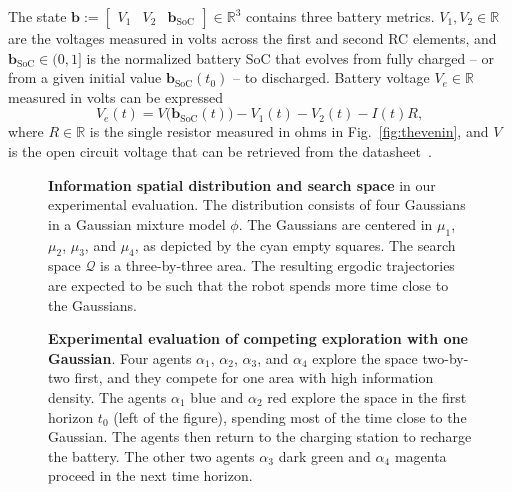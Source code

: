 \documentclass[letterpaper,10pt,conference,twoside]{IEEEtran}
\theoremstyle{definition}
\begin{document}
The state $\mathbf{b}:=\begin{bmatrix}V_1&V_2&\mathbf{b}_{\text{SoC}}\end{bmatrix}\in\mathbb{R}^3$ contains three battery metrics. $V_1,V_2\in\mathbb{R}$ are the voltages measured in volts across the first and second RC elements, and $\mathbf{b}_{\text{SoC}}\in(0,1]$ is the normalized battery SoC that evolves from fully charged -- or from a given initial value $\mathbf{b}_{\text{SoC}}(t_0)$ -- to discharged. 
%
Battery voltage $V_e\in\mathbb{R}$ measured in volts can be %
expressed %
\begin{equation}\label{eq:battvolt}
  V_e(t)=V\big(\mathbf{b}_{\text{SoC}}(t)\big)-V_1(t)-V_2(t)-I(t)R,
\end{equation}
where $R\in\mathbb{R}$ is the single resistor measured in ohms in Fig.~\ref{fig:thevenin}, and $V$ is the open circuit voltage that %
can be retrieved from the %
datasheet~\cite{hinz2019comparison}.


\begin{figure}[t!]
  \begin{minipage}[t!]{.5\columnwidth}
    \vspace*{-.2cm}
    
  \end{minipage}
  \begin{minipage}[c]{.48\columnwidth}
    \vspace*{.05cm}
    \caption{\textbf{Information spatial distribution and search space} in our experimental evaluation. The distribution consists of four Gaussians in a Gaussian mixture model $\phi$. The Gaussians are centered in $\mu_1$, $\mu_2$, $\mu_3$, and $\mu_4$, as depicted by the cyan empty squares. The search space $\mathcal{Q}$ is a three-by-three area. The resulting ergodic trajectories are expected to be such that the robot spends more time close to the Gaussians.}
    \label{fig:scenario}
  \end{minipage}
  \vspace*{-.15cm}
\end{figure}

\begin{figure}[b!]
  \vspace*{-.15cm}
  
  \caption{\textbf{Experimental evaluation of %
  competing exploration with one Gaussian}.
  Four agents $\alpha_1$, $\alpha_2$, $\alpha_3$, and $\alpha_4$ explore the space two-by-two first, and they compete for one area with high information density. The agents $\alpha_1$ blue and $\alpha_2$ red explore the space in the first horizon $t_0$ (left of the figure), spending most of the time close to the Gaussian. The agents then return to the charging station to recharge the battery. The other two agents $\alpha_3$ dark green and $\alpha_4$ magenta proceed in the next time horizon.}%
  \label{fig:res2}
\end{figure}
\end{document}
